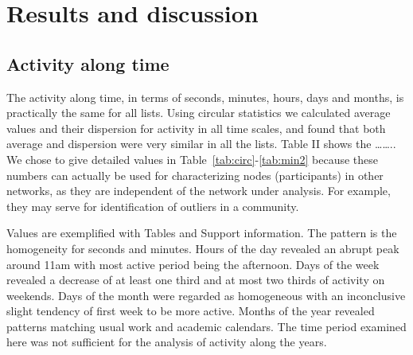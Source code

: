 \documentclass[%
 aip,
 jmp,%
 amsmath,amssymb,
 reprint,%
]{revtex4-1}
\begin{document}
\section{Results and discussion}\label{sec:results}



\subsection{Activity along time}\label{constDisc}

The activity along time, in terms of seconds, minutes, hours, days and months,  is practically the same for all lists.
Using circular statistics we calculated average values and their dispersion for activity in all time scales, and found that both average and dispersion were very similar in all the lists.
Table II shows the …….. 
We chose to give detailed values in Table~\ref{tab:circ}-\ref{tab:min2} because these numbers can actually be used for characterizing nodes (participants) in other networks, as they are independent of the network under analysis. For example, they may serve for identification of outliers in a community.

Values are exemplified with Tables and Support information.
The pattern is the homogeneity for seconds and minutes.
Hours of the day revealed an abrupt peak around 11am with most active period being the afternoon.
Days of the week revealed a decrease of at least one third and at most two thirds of activity on weekends.
Days of the month were regarded as homogeneous with an inconclusive slight tendency of first week to be more active.
Months of the year revealed patterns matching usual work and academic calendars.
The time period examined here was not sufficient for the analysis of activity along the years.
\end{document}
